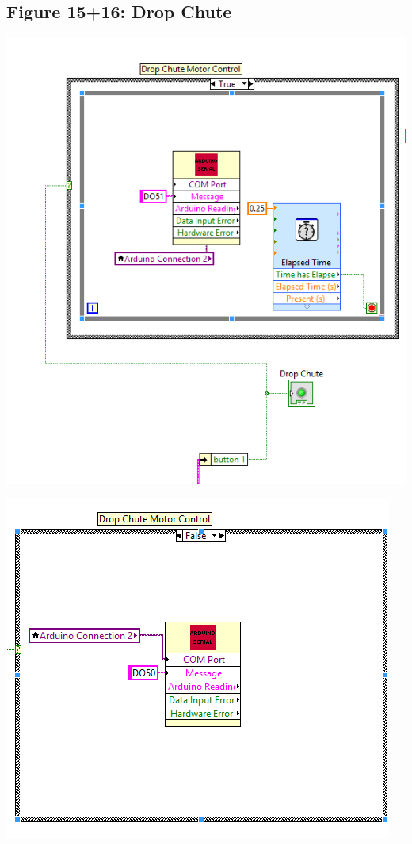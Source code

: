 \documentclass{article}
\begin{document}
\subsection{Figure 15+16: Drop Chute}
\begin{center}{ \includegraphics[width=\textwidth]{DropChute1.png}}\end{center}
\begin{center}{ \includegraphics[width=\textwidth]{DropChute2.png}}\end{center}
\end{document}
